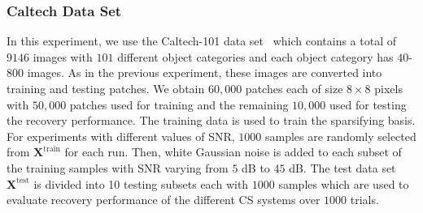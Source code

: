 \subsubsection{Caltech Data Set}
\label{subsec: Chap4_caltech_result}
%
In this experiment, we use the Caltech-101 data set~\cite{Caltech101} which contains a total of $9146$ images with $101$ different object categories and each object category has $40$-$800$ images. As in the previous experiment, these images are converted into training and testing patches. We obtain $60,000$ patches each of size $8 \times 8$ pixels with $50,000$ patches used for training and the remaining $10,000$ used for testing the recovery performance. The training data is used to train the sparsifying basis. For experiments with different values of SNR, $1000$ samples are randomly selected from $\bm{X}^{\text{train}}$ for each run. Then, white Gaussian noise is added to each subset of the training samples with SNR varying from $5$ dB to $45$ dB. The test data set $\bm{X}^{\text{test}}$ is divided into 10 testing subsets each with $1000$ samples which are used to evaluate recovery performance of the different CS systems over $1000$ trials. 

